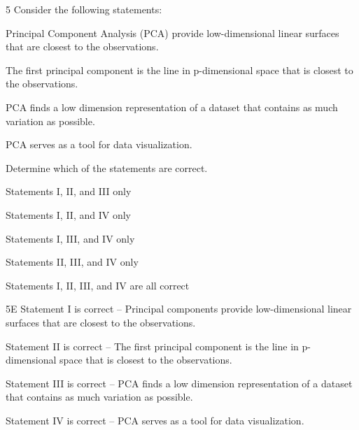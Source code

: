 \begin{question}{5}
Consider the following statements:
\begin{statements}
\item Principal Component Analysis (PCA) provide low-dimensional linear surfaces that are closest to the observations.
\item The first principal component is the line in p-dimensional space that is closest to the observations.
\item PCA finds a low dimension representation of a dataset that contains as much variation as possible.
\item PCA serves as a tool for data visualization.
\end{statements}

Determine which of the statements are correct.

\begin{choices}
\item Statements I, II, and III only
\item Statements I, II, and IV only
\item Statements I, III, and IV only
\item Statements II, III, and IV only
\item Statements I, II, III, and IV are all correct
\end{choices}
\end{question}
\begin{solution}{5}{E}
Statement I is correct -- Principal components provide low-dimensional linear surfaces that are closest to the observations.

Statement II is correct -- The first principal component is the line in p-dimensional space that is closest to the observations.

Statement III is correct -- PCA finds a low dimension representation of a dataset that contains as much variation as possible.

Statement IV is correct -- PCA serves as a tool for data visualization.
\end{solution}

